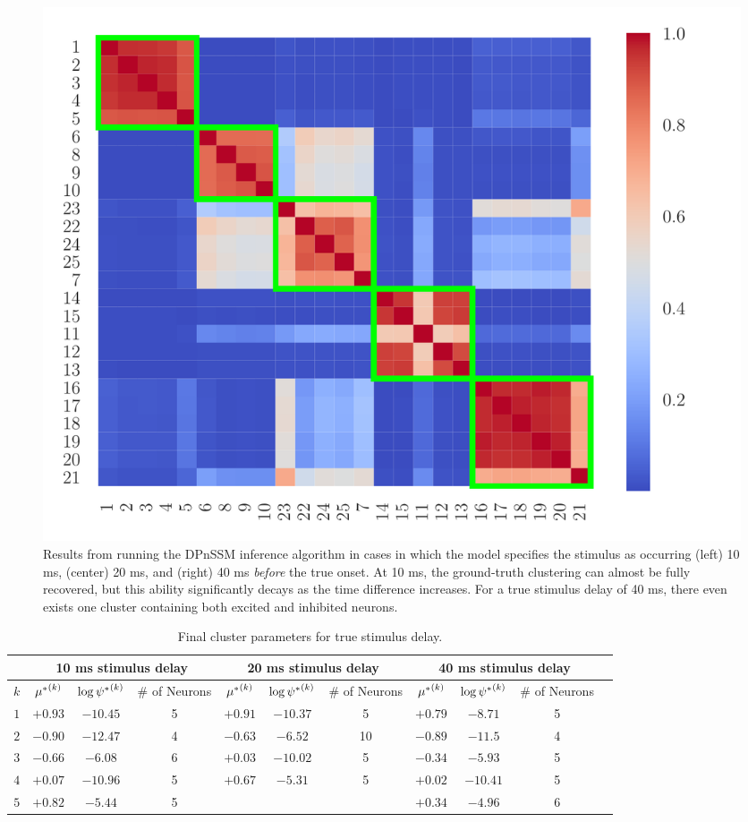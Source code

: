 \documentclass[twoside]{article}
\begin{document}
\begin{figure}[h]
\begin{center}
\includegraphics[scale=0.26]{../img/sim_shift-8.pdf}
\end{center}
\caption{Results from running the DPnSSM inference algorithm in cases in which the model specifies the stimulus as occurring (left) 10 ms, (center) 20 ms, and (right) 40 ms \emph{before} the true onset.  At 10 ms, the ground-truth clustering can almost be fully recovered, but this ability significantly decays as the time difference increases.  For a true stimulus delay of 40 ms, there even exists one cluster containing both excited and inhibited neurons.} \label{underpredict}
\end{figure}

\begin{table}[h]
\vspace{-3mm}
\caption{Final cluster parameters for true stimulus delay.} \label{robust-table2}
\begin{center}
\begin{tabular}{c|ccc|ccc|cccl}
\multicolumn{1}{c}{} &\multicolumn{3}{c}{10 ms stimulus delay} &\multicolumn{3}{c}{20 ms stimulus delay} &\multicolumn{3}{c}{40 ms stimulus delay} \\
\hline
$k$ & ${\mu^*}^{(k)}_{}$ & $\log {\psi^*}^{(k)}_{}$ &\# of Neurons & ${\mu^*}^{(k)}_{}$ & $\log {\psi^*}^{(k)}_{}$ &\# of Neurons & ${\mu^*}^{(k)}_{}$ & $\log {\psi^*}^{(k)}_{}$ &\# of Neurons \\
\hline
$1$ & $+0.93$ & $-10.45$ & 5 & $+0.91$ & $-10.37$ & 5 & $+0.79$ & $-8.71$ & 5  \\
$2$ &$-0.90$ & $-12.47$ & 4 & $-0.63$ & $-6.52$ & 10 & $-0.89$ & $-11.5$ & 4 \\
$3$ &$-0.66$ & $-6.08$  & 6 & $+0.03$ & $-10.02$ & 5 & $-0.34$ & $-5.93$ & 5 \\
$4$ &$+0.07$ & $-10.96$ & 5 & $+0.67$ & $-5.31$ & 5 & $+0.02$ & $-10.41$ & 5 \\
$5$ &$+0.82$ & $-5.44$ & 5 & & & & $+0.34$ & $-4.96$ & 6
\end{tabular}
\vspace{-4mm}
\end{center}\end{table}   
\end{document}
